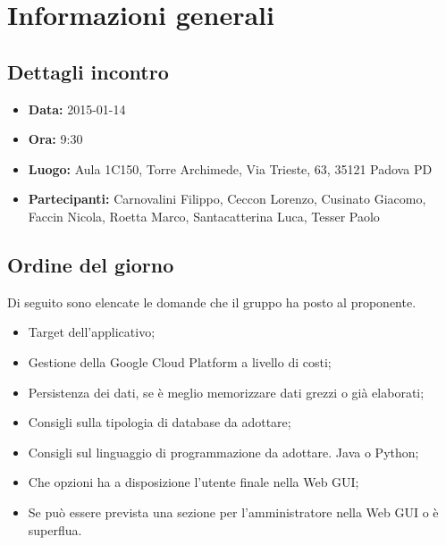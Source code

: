 %


\section{Informazioni generali} %
\label{sec:informazioni_generali}
	\subsection{Dettagli incontro} %
	\label{sub:dettagli_incontro}
		\begin{itemize}
			\item \textbf{Data:} 2015-01-14
			\item \textbf{Ora:} 9:30
			\item \textbf{Luogo:} Aula 1C150, Torre Archimede, Via Trieste, 63, 35121 Padova PD
			\item \textbf{Partecipanti:} Carnovalini Filippo, Ceccon Lorenzo, Cusinato Giacomo, Faccin Nicola, Roetta Marco, Santacatterina Luca, Tesser Paolo
		\end{itemize}
	
	\subsection{Ordine del giorno} %
	\label{sub:ordine_del_giorno}
	Di seguito sono elencate le domande che il gruppo ha posto al proponente.
		\begin{itemize}
			\item Target dell'applicativo;
			\item Gestione della Google Cloud Platform a livello di costi;
			\item Persistenza dei dati, se è meglio memorizzare dati grezzi o già elaborati;
			\item Consigli sulla tipologia di database da adottare;
			\item Consigli sul linguaggio di programmazione da adottare. Java o Python;
			\item Che opzioni ha a disposizione l'utente finale nella Web GUI;
			\item Se può essere prevista una sezione per l'amministratore nella Web GUI o è superflua.
		\end{itemize}
